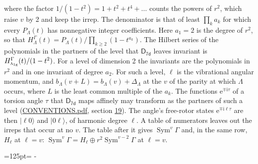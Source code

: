 \documentclass[10pt,a4paper]{article}
\newcommand{\needspace}[1]{\par\penalty-100\begingroup\dimen0=#1\relax\dimen2=\pagegoal
  \advance\dimen2-\pagetotal\ifdim\dimen0>\dimen2\relax\ifdim\dimen2>0pt\vfil\break\fi\fi
  \endgroup}
\numberwithin{equation}{section}
\newcommand{\grp}[1]{\mathsf{#1}}
\newcommand{\irr}[1]{\text{\normalfont\scshape #1}}
\newcommand{\ptag}[1]{\mathrm{#1}}
\newcommand{\iunit}{\mathrm{i}}
\newcommand{\expe}{\mathrm{e}}
\newcommand{\occ}[1]{\lvert #1\rangle}
\begin{document}
where the factor $1/(1 - t^2) = 1 + t^2 + t^4 + \dots$ counts the powers of $r^2$, which raise $v$ by 2 and keep the irrep. The denominator is that of least $\prod_k a_k$ for which every $P_\Lambda(t)$ has nonnegative integer coefficients. Here $a_1 = 2$ is the degree of $r^2$, so that $H^{\Gamma}_\Lambda(t) = P_\Lambda(t)/\prod_{k\ge2}(1 - t^{a_k})$. The Hilbert series of the polynomials in the partners of the level that $\grp{D_{7d}}$ leaves invariant is $H^{\Gamma}_{\irr{a}_{1\ptag{g}}}(t)/(1 - t^2)$. For a level of dimension 2 the invariants are the polynomials in $r^2$ and in one invariant of degree $a_2$. \label{n:index.overtone.period}\label{n:index.increment.unitary}For such a level, $\ell$ is the vibrational angular momentum, and $b_\Lambda(v + L) = b_\Lambda(v) + \Delta_\Lambda$ at the $v$ of the parity at which $\Lambda$ occurs, where $L$ is the least common multiple of the $a_k$. \label{n:local.torsion.angle}The functions $\expe^{\mp\iunit\tau}$ of a torsion angle $\tau$ that $\grp{D_{7d}}$ maps affinely may transform as the partners of such a level (\href{../../CONVENTIONS.pdf}{CONVENTIONS.pdf}, section \href{../../CONVENTIONS.pdf\#conv.19}{19}). The angle's free-rotor states $\expe^{\mp\iunit\ell\tau}$ are then $\occ{\ell 0}$ and $\occ{0 \ell}$, of harmonic degree $\ell$. A table of numerators leaves out the irreps that occur at no $v$. The table after it gives $\operatorname{Sym}^{v}\Gamma$ and, in the same row, $H_\ell$ at $\ell = v$: $\operatorname{Sym}^{v}\Gamma = H_\ell \oplus r^2\operatorname{Sym}^{v-2}\Gamma$ at $\ell = v$.
\needspace{125pt}
\end{document}
